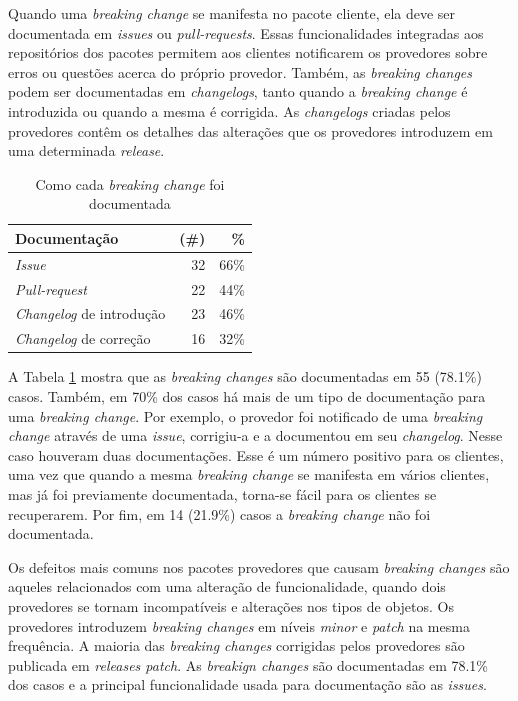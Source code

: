 Quando uma \textit{breaking change} se manifesta no pacote cliente, ela deve ser documentada em \textit{issues} ou \textit{pull-requests}. Essas funcionalidades integradas aos repositórios dos pacotes permitem aos clientes notificarem os provedores sobre erros ou questões acerca do próprio provedor. Também, as \textit{breaking changes} podem ser documentadas em \textit{changelogs}, tanto quando a \textit{breaking change} é introduzida ou quando a mesma é corrigida. As \textit{changelogs} criadas pelos provedores contêm os detalhes das alterações que os provedores introduzem em uma determinada \textit{release}.

\begin{table}
	\centering
	\caption{Como cada \textit{breaking change} foi documentada}
	\begin{tabular}{lrr}
		\toprule
		\textbf{Documentação} & (\#)        & \textbf{\%}     \\ \hline
		\textit{Issue}        & 32          & 66\%            \\
		\textit{Pull-request} & 22          & 44\%            \\
		\textit{Changelog} de introdução & 23          & 46\%            \\
		\textit{Changelog} de correção   & 16          & 32\%            \\ %
		\bottomrule
	\end{tabular}
	\label{tab:bc_documentation}
\end{table}

A Tabela \ref{tab:bc_documentation} mostra que as \textit{breaking changes} são documentadas em 55 (78.1\%) casos. Também, em 70\% dos casos há mais de um tipo de documentação para uma \textit{breaking change}. Por exemplo, o provedor foi notificado de uma \textit{breaking change} através de uma \textit{issue}, corrigiu-a e a documentou em seu \textit{changelog}. Nesse caso houveram duas documentações. Esse é um número positivo para os clientes, uma vez que quando a mesma \textit{breaking change} se manifesta em vários clientes, mas já foi previamente documentada, torna-se fácil para os clientes se recuperarem. Por fim, em 14 (21.9\%) casos a \textit{breaking change} não foi documentada.

\begin{mdframed}
Os defeitos mais comuns nos pacotes provedores que causam \textit{breaking changes} são aqueles relacionados com uma alteração de funcionalidade, quando dois provedores se tornam incompatíveis e alterações nos tipos de objetos. Os provedores introduzem \textit{breaking changes} em níveis \textit{minor} e \textit{patch} na mesma frequência. A maioria das \textit{breaking changes} corrigidas pelos provedores são publicada em \textit{releases patch}. As \textit{breakign changes} são documentadas em 78.1\% dos casos e a principal funcionalidade usada para documentação são as \textit{issues}.
\end{mdframed}
